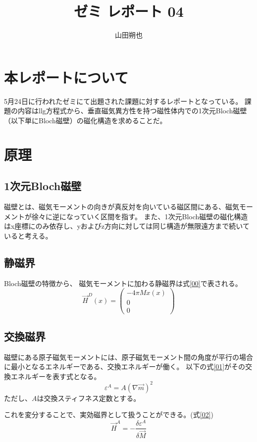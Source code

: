 \documentclass{jsarticle}
\begin{document}
\title{ゼミ レポート 04}
\author{山田朔也}
\maketitle

\section{本レポートについて}
5月24日に行われたゼミにて出題された課題に対するレポートとなっている。
課題の内容はllg方程式から、垂直磁気異方性を持つ磁性体内での1次元Bloch磁壁（以下単にBloch磁壁）の磁化構造を求めることだ。

\section{原理}
\subsection{1次元Bloch磁壁}
磁壁とは、磁気モーメントの向きが真反対を向いている磁区間にある、磁気モーメントが徐々に逆になっていく区間を指す。
また、1次元Bloch磁壁の磁化構造はx座標にのみ依存し、yおよびz方向に対しては同じ構造が無限遠方まで続いていると考える。

\subsection{静磁界}
Bloch磁壁の特徴から、
磁気モーメントに加わる静磁界は式\ref{00}で表される。
\begin{equation}
	\vec{H}^D (x) = 
	\begin{pmatrix}
		-4\pi Mx(x)\\
		0\\
		0
	\end{pmatrix}
	\label{00}
\end{equation}


\subsection{交換磁界}
磁壁にある原子磁気モーメントには、原子磁気モーメント間の角度が平行の場合に最小となるエネルギーである、交換エネルギーが働く。
以下の式\ref{01}がその交換エネルギーを表す式となる。
\begin{equation}
	\label{01}
	\varepsilon^A = A(\nabla \vec{m})^2
\end{equation}
ただし、$A$は交換スティフネス定数とする。

これを変分することで、実効磁界として扱うことができる。(式\ref{02})
\begin{equation}
	\label{02}
	\vec{H}^A = -\frac{\delta \varepsilon^A}{\delta \vec{M}}
\end{equation}
\end{document}
